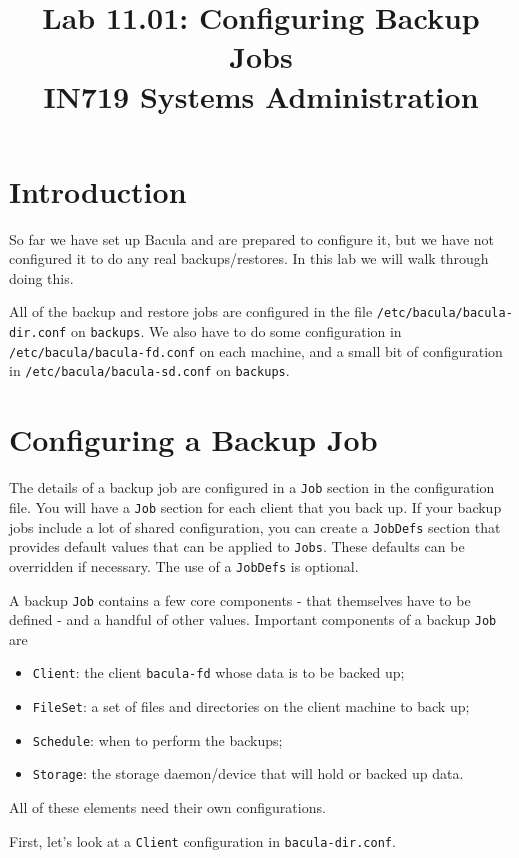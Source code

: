 \documentclass{article}   	%
\title{Lab 11.01:  Configuring Backup Jobs\\ IN719 Systems Administration}
\date{}							%
\begin{document}
\maketitle

\section*{Introduction}
So far we have set up Bacula and are prepared to configure it, but we have not configured it to do any real backups/restores. In this lab we will walk through doing this.

All of the backup and restore jobs are configured in the file \texttt{/etc/bacula/bacula-dir.conf} on \texttt{backups}. We also have to do some configuration in  \texttt{/etc/bacula/bacula-fd.conf} on each machine, and a small bit of configuration in  \texttt{/etc/bacula/bacula-sd.conf} on \texttt{backups}.

\section{Configuring a Backup Job}
The details of a backup job are configured in a \texttt{Job} section in the configuration file.  You will have a \texttt{Job} section for each client that you back up.  If your backup jobs include a lot of shared configuration, you can create a \texttt{JobDefs} section that provides default values that can be applied to \texttt{Jobs}.  These defaults can be overridden if necessary.  The use of a \texttt{JobDefs} is optional.

A backup \texttt{Job} contains a few core components - that themselves have to be defined - and a handful of other values.  Important components of a backup \texttt{Job} are

\begin{itemize}
	\item \texttt{Client}: the client \texttt{bacula-fd} whose data is to be backed up;
	\item \texttt{FileSet}: a set of files and directories on the client machine to back up;
	\item \texttt{Schedule}: when to perform the backups;
	\item \texttt{Storage}: the storage daemon/device that will hold or backed up data.
\end{itemize}

All of these elements need their own configurations.

First, let's look at a \texttt{Client} configuration in \texttt{bacula-dir.conf}.
\end{document}
